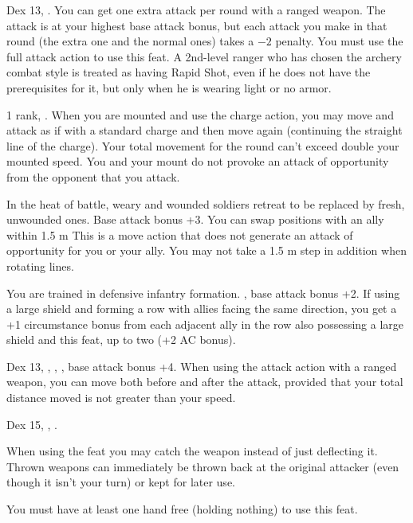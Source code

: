 {}
{Dex 13, .}
{You can get one extra attack per round with a ranged weapon. The attack is at your highest base attack bonus, but each attack you make in that round (the extra one and the normal ones) takes a $-2$ penalty. You must use the full attack action to use this feat.}{}
{A 2nd-level ranger who has chosen the archery combat style is treated as having Rapid Shot, even if he does not have the prerequisites for it, but only when he is wearing light or no armor.}

{ 1 rank, .}
{When you are mounted and use the charge action, you may move and attack as if with a standard charge and then move again (continuing the straight line of the charge). Your total movement for the round can't exceed double your mounted speed. You and your mount do not provoke an attack of opportunity from the opponent that you attack.}

{In the heat of battle, weary and wounded soldiers retreat to be replaced by fresh, unwounded ones.}
{Base attack bonus +3.}
{You can swap positions with an ally within 1.5 m This is a move action that does not generate an attack of opportunity for you or your ally. You may not take a 1.5 m step in addition when rotating lines.}{}{}

{You are trained in defensive infantry formation.}
{, base attack bonus +2.}
{If using a large shield and forming a row with allies facing the same direction, you get a +1 circumstance bonus from each adjacent ally in the row also possessing a large shield and this feat, up to two (+2 AC bonus).}{}{}

{Dex 13, , , , base attack bonus +4.}
{When using the attack action with a ranged weapon, you can move both before and after the attack, provided that your total distance moved is not greater than your speed.}

{Dex 15, , .}
{When using the  feat you may catch the weapon instead of just deflecting it. Thrown weapons can immediately be thrown back at the original attacker (even though it isn't your turn) or kept for later use.

You must have at least one hand free (holding nothing) to use this feat.}


